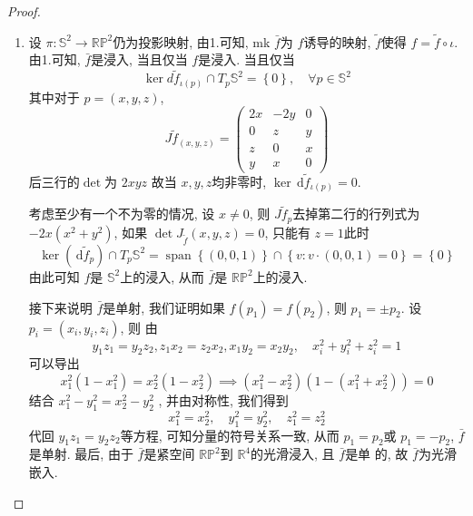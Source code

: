 \documentclass[../main.tex]{subfiles}
\begin{document}
\begin{proof}
\begin{enumerate}
   \item 设 \(   \pi : \mathbb{S}^{2}\to \mathbb{RP}^{2}  \)仍为投影映射, 由1.可知, mk \(  \bar{f}  \)为 \(  f  \)诱导的映射, \(  \tilde{f}  \)使得 \(  f= \tilde{f}\circ \iota   \).   由1.可知, \(  \bar{f}  \)是浸入, 当且仅当 \(  f  \)是浸入. 当且仅当  \[
   \operatorname{ker} d \tilde{f}_{\iota \left( p \right) }\cap T_{p}\mathbb{S}^{2}= \left\{ 0 \right\},\quad \forall p \in \mathbb{S}^{2}
   \]    其中对于 \(  p= \left( x,y,z \right)   \),   \[
   J \tilde{f}_{\left( x,y,z \right) }= \begin{pmatrix} 
       2x&-2y&0\\ 
        0&z&y\\ 
         z&0&x\\ 
          y&x&0 
   \end{pmatrix} 
   \] 后三行的\(  \det   \)为 \(  2xyz  \) 故当 \(  x,y,z  \)均非零时,  \(  \operatorname{ker}\,\mathrm{d} \tilde{f}_{\iota \left( p \right) }= 0  \). 
   
   考虑至少有一个不为零的情况, 设 \(  x\neq 0  \), 则 \(  J \tilde{f}_{p}  \)去掉第二行的行列式为 \(  -2x\left( x^{2}+ y^{2} \right)   \), 如果 \(  \det J_{\tilde{f}}\left( x,y,z \right)= 0   \), 只能有 \(  z= 1  \)此时 \[
   \operatorname{ker}\left( \,\mathrm{d}  \tilde{f}_{p} \right)\cap T_{p}\mathbb{S}^{2}= \operatorname{span}\left\{ \left( 0,0,1 \right)  \right\}\cap \left\{ v:v\cdot \left( 0,0,1 \right)= 0  \right\}= \left\{ 0 \right\} 
   \]     由此可知 \(  f  \)是 \(  \mathbb{S}^{2}  \)上的浸入, 从而 \(  \bar{f}  \)是 \(  \mathbb{RP}^{2}  \)上的浸入.  
   
   接下来说明 \(  \bar{f}  \)是单射, 我们证明如果 \(  f\left( p_1 \right)= f\left( p_2 \right)    \), 则 \(  p_1= \pm p_2  \). 设 \(  p_{i}= \left( x_{i},y_{i},z_{i} \right)   \), 则 由 \[
   y_1z_1= y_2z_2, z_1x_2= z_2x_2, x_1y_2= x_2y_2,\quad x_{i}^{2}+ y_{i}^{2}+ z_{i}^{2}= 1
   \]可以导出 \[
   x_1^{2}\left( 1-x_1^{2} \right)= x_2^{2}\left( 1-x_2^{2} \right)  \implies \left( x_1^{2}-x_2^{2} \right)\left( 1-\left( x_1^{2}+ x_2 ^{2}\right)  \right)= 0  
   \]    结合 \(  x_1^{2}-y_1^{2}= x_2^{2}-y_2^{2}  \) , 并由对称性, 我们得到 \[
   x_1^{2}= x_2^{2}, \quad y_1^{2}= y_2^{2},\quad z_1^{2}= z_2^{2}
   \]代回 \(  y_1z_1= y_2z_2  \)等方程, 可知分量的符号关系一致, 从而 \(  p_1= p_2  \)或 \(  p_1= -p_2  \), \(  \bar{f}  \)是单射.
   最后, 由于 \(  \bar{f}  \)是紧空间 \(  \mathbb{RP}^{2}  \)到 \(  \mathbb{R} ^{4}  \)的光滑浸入, 且 \(  \bar{f}  \)是单 的, 故 \(  \bar{f}  \)为光滑嵌入.        
  \end{enumerate}
 
\end{proof}
\end{document}
